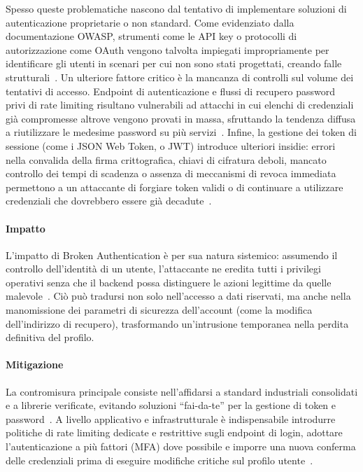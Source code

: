 Spesso queste problematiche nascono dal tentativo di implementare soluzioni di autenticazione proprietarie o non standard. Come evidenziato dalla documentazione OWASP, strumenti come le API key o protocolli di autorizzazione come OAuth vengono talvolta impiegati impropriamente per identificare gli utenti in scenari per cui non sono stati progettati, creando falle strutturali~\cite{owasp2023api2}.
Un ulteriore fattore critico è la mancanza di controlli sul volume dei tentativi di accesso. Endpoint di autenticazione e flussi di recupero password privi di rate limiting risultano vulnerabili ad attacchi in cui elenchi di credenziali già compromesse altrove vengono provati in massa, sfruttando la tendenza diffusa a riutilizzare le medesime password su più servizi~\cite{owasp2026credential}.
Infine, la gestione dei token di sessione (come i JSON Web Token, o JWT) introduce ulteriori insidie: errori nella convalida della firma crittografica, chiavi di cifratura deboli, mancato controllo dei tempi di scadenza o assenza di meccanismi di revoca immediata permettono a un attaccante di forgiare token validi o di continuare a utilizzare credenziali che dovrebbero essere già decadute~\cite{rfc8725}.

\paragraph{Impatto}

L'impatto di Broken Authentication è per sua natura sistemico: assumendo il controllo dell'identità di un utente, l'attaccante ne eredita tutti i privilegi operativi senza che il backend possa distinguere le azioni legittime da quelle malevole~\cite{owasp2023api2}. Ciò può tradursi non solo nell'accesso a dati riservati, ma anche nella manomissione dei parametri di sicurezza dell'account (come la modifica dell'indirizzo di recupero), trasformando un'intrusione temporanea nella perdita definitiva del profilo.

\paragraph{Mitigazione}

La contromisura principale consiste nell'affidarsi a standard industriali consolidati e a librerie verificate, evitando soluzioni ``fai-da-te'' per la gestione di token e password~\cite{nist2025sp80063b}. A livello applicativo e infrastrutturale è indispensabile introdurre politiche di rate limiting dedicate e restrittive sugli endpoint di login, adottare l'autenticazione a più fattori (MFA) dove possibile e imporre una nuova conferma delle credenziali prima di eseguire modifiche critiche sul profilo utente~\cite{owasp2026authentication}.

